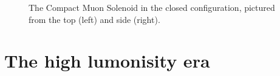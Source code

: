 \begin{figure}[htb]
    \centering
    \quad
    \caption{
        The Compact Muon Solenoid in the closed configuration, pictured from the top (left) and side (right).
    }
    \label{fig:cms_jguiang}
\end{figure}
\section{The high lumonisity era}
